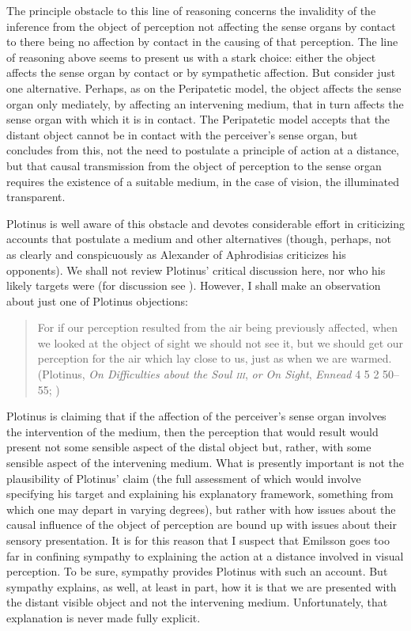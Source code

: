 The principle obstacle to this line of reasoning concerns the invalidity of the inference from the object of perception not affecting the sense organs by contact to there being no affection by contact in the causing of that perception. The line of reasoning above seems to present us with a stark choice: either the object affects the sense organ by contact or by sympathetic affection. But consider just one alternative. Perhaps, as on the Peripatetic model, the object affects the sense organ only mediately, by affecting an intervening medium, that in turn affects the sense organ with which it is in contact. The Peripatetic model accepts that the distant object cannot be in contact with the perceiver's sense organ, but concludes from this, not the need to postulate a principle of action at a distance, but that causal transmission from the object of perception to the sense organ requires the existence of a suitable medium, in the case of vision, the illuminated transparent.

Plotinus is well aware of this obstacle and devotes considerable effort in criticizing accounts that postulate a medium and other alternatives (though, perhaps, not as clearly and conspicuously as Alexander of Aphrodisias criticizes his opponents). We shall not review Plotinus' critical discussion here, nor who his likely targets were (for discussion see \citealt[chapter 3.1]{Emilsson:1988uq}). However, I shall make an observation about just one of Plotinus objections:
\begin{quote}
	For if our perception resulted from the air being previously affected, when we looked at the object of sight we should not see it, but we should get our perception for the air which lay close to us, just as when we are warmed. (Plotinus, \emph{On Difficulties about the Soul \textsc{iii}}, \emph{or On Sight}, \emph{Ennead} 4 5 2 50--55; \citealt[289]{Armstrong:1984aa})
\end{quote}
Plotinus is claiming that if the affection of the perceiver's sense organ involves the intervention of the medium, then the perception that would result would present not some sensible aspect of the distal object but, rather, with some sensible aspect of the intervening medium. What is presently important is not the plausibility of Plotinus' claim (the full assessment of which would involve specifying his target and explaining his explanatory framework, something from which one may depart in varying degrees), but rather with how issues about the causal influence of the object of perception are bound up with issues about their sensory presentation. It is for this reason that I suspect that Emilsson goes too far in confining sympathy to explaining the action at a distance involved in visual perception. To be sure, sympathy provides Plotinus with such an account. But sympathy explains, as well, at least in part, how it is that we are presented with the distant visible object and not the intervening medium. Unfortunately, that explanation is never made fully explicit.

